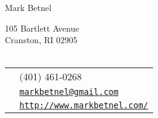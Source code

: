 \documentclass[letterpaper]{article}
\def\name{Mark Betnel}
\renewenvironment{itemize}{
  \begin{list}{}{
    \setlength{\leftmargin}{1em}
  }
}{
  \end{list}
}
\begin{document}
{\huge \name}


\vspace{0.25in}

\begin{minipage}{0.45\linewidth}
  105 Bartlett Avenue \\
  Cranston, RI 02905 \\
    \\
  \end{minipage}
\begin{minipage}{0.05\linewidth}
  \begin{tabular}{ll}
     & (401) 461-0268 \\
     & \href{mailto:markbetnel@gmail.com}{\tt markbetnel@gmail.com} \\
     & \href{http://www.markbetnel.com/}{\tt http://www.markbetnel.com/} \\
  \end{tabular}
\end{minipage}


\end{document}

